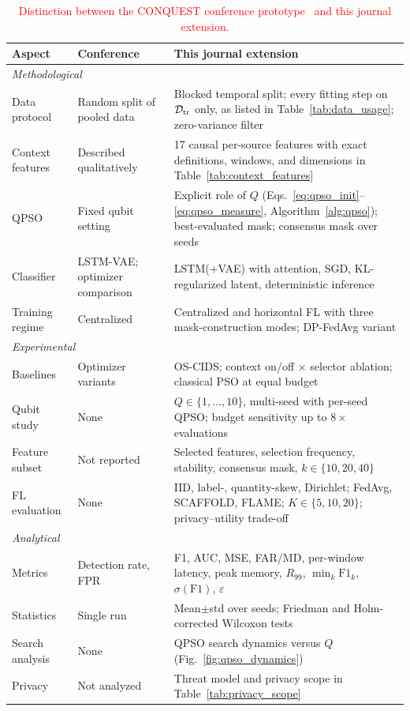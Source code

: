 \documentclass[conference]{IEEEtran}
\begin{document}
\begin{table}[!t]
\centering
\scriptsize
\caption{\textcolor{red}{Distinction between the CONQUEST conference prototype~\cite{ajakweconquest} and this journal extension.}}
\label{tab:conf_vs_journal}
\setlength{\tabcolsep}{3pt}
\renewcommand{\arraystretch}{1.10}
\color{red}
\begin{tabular}{p{1.5cm} p{2.4cm} p{3.9cm}}
\hline\toprule
\textbf{Aspect} & \textbf{Conference~\cite{ajakweconquest}} & \textbf{This journal extension} \\
\hline\toprule
\multicolumn{3}{l}{\textit{Methodological}} \\
Data protocol & Random split of pooled data & Blocked temporal split; every fitting step on $\mathcal{D}_{\rm tr}$ only, as listed in Table~\ref{tab:data_usage}; zero-variance filter \\
Context features & Described qualitatively & 17 causal per-source features with exact definitions, windows, and dimensions in Table~\ref{tab:context_features} \\
QPSO & Fixed qubit setting & Explicit role of $Q$ (Eqs.~\eqref{eq:qpso_init}--\eqref{eq:qpso_measure}, Algorithm~\ref{alg:qpso}); best-evaluated mask; consensus mask over seeds \\
Classifier & LSTM-VAE; optimizer comparison & LSTM(+VAE) with attention, SGD, KL-regularized latent, deterministic inference \\
Training regime & Centralized & Centralized and horizontal FL with three mask-construction modes; DP-FedAvg variant \\
\midrule
\multicolumn{3}{l}{\textit{Experimental}} \\
Baselines & Optimizer variants & OS-CIDS; context on/off $\times$ selector ablation; classical PSO at equal budget \\
Qubit study & None & $Q\in\{1,\dots,10\}$, multi-seed with per-seed QPSO; budget sensitivity up to $8\times$ evaluations \\
Feature subset & Not reported & Selected features, selection frequency, stability, consensus mask, $k\in\{10,20,40\}$ \\
FL evaluation & None & IID, label-, quantity-skew, Dirichlet; FedAvg, SCAFFOLD, FLAME; $K\in\{5,10,20\}$; privacy--utility trade-off \\
\midrule
\multicolumn{3}{l}{\textit{Analytical}} \\
Metrics & Detection rate, FPR & F1, AUC, MSE, FAR/MD, per-window latency, peak memory, $R_{99}$, $\min_k\mathrm{F1}_k$, $\sigma(\mathrm{F1})$, $\varepsilon$ \\
Statistics & Single run & Mean$\pm$std over seeds; Friedman and Holm-corrected Wilcoxon tests \\
Search analysis & None & QPSO search dynamics versus $Q$ (Fig.~\ref{fig:qpso_dynamics}) \\
Privacy & Not analyzed & Threat model and privacy scope in Table~\ref{tab:privacy_scope} \\
\hline\toprule
\end{tabular}
\end{table}
\end{document}
